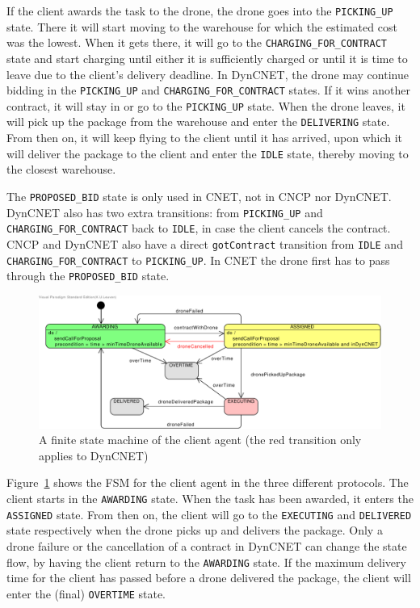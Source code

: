 \documentclass[10pt,a4paper,twocolumn]{article}
\newcommand{\commentV}[1]{\todo[inline, color=yellow]{Victor: #1}}
\begin{document}
If the client awards the task to the drone, the drone goes into the \texttt{PICKING\_UP} state. There it will start moving to the warehouse for which the estimated cost was the lowest. When it gets there, it will go to the \texttt{CHARGING\_FOR\_CONTRACT} state and start charging until either it is sufficiently charged or until it is time to leave due to the client's delivery deadline. In DynCNET, the drone may continue bidding in the \texttt{PICKING\_UP} and \texttt{CHARGING\_FOR\_CONTRACT} states. If it wins another contract, it will stay in or go to the \texttt{PICKING\_UP} state. When the drone leaves, it will pick up the package from the warehouse and enter the \texttt{DELIVERING} state. From then on, it will keep flying to the client until it has arrived, upon which it will deliver the package to the client and enter the \texttt{IDLE} state, thereby moving to the closest warehouse.

The \texttt{PROPOSED\_BID} state is only used in CNET, not in CNCP nor DynCNET.  DynCNET also has two extra transitions: from \texttt{PICKING\_UP} and \texttt{CHARGING\_FOR\_CONTRACT} back to \texttt{IDLE}, in case the client cancels the contract. CNCP and DynCNET also have a direct \texttt{gotContract} transition from \texttt{IDLE} and \texttt{CHARGING\_FOR\_CONTRACT} to \texttt{PICKING\_UP}. In CNET the drone first has to pass through the \texttt{PROPOSED\_BID} state.

\begin{figure}[htp]
    \centering
    \includegraphics[width=\columnwidth]{Client}
    \caption{A finite state machine of the client agent (the red transition only applies to DynCNET) \commentV{te klein in twocolumn?}}
    \label{fig:clientFSM}
\end{figure}

Figure~\ref{fig:clientFSM} shows the FSM for the client agent in the three different protocols. The client starts in the \texttt{AWARDING} state. When the task has been awarded, it enters the \texttt{ASSIGNED} state. From then on, the client will go to the \texttt{EXECUTING} and \texttt{DELIVERED} state respectively when the drone picks up and delivers the package. Only a drone failure or the cancellation of a contract in DynCNET can change the state flow, by having the client return to the \texttt{AWARDING} state. If the maximum delivery time for the client has passed before a drone delivered the package, the client will enter the (final) \texttt{OVERTIME} state.
\end{document}
